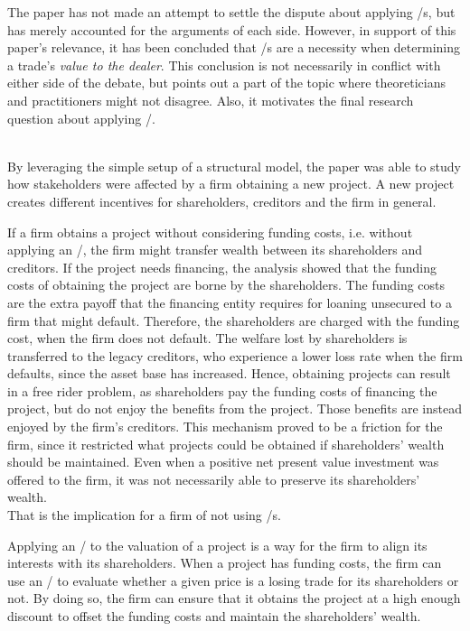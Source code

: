 \documentclass[main.tex]{subfiles}
\begin{document}
    The paper has not made an attempt to settle the dispute about applying \FVA/s,
    but has merely accounted for the arguments of each side.
    However, in support of this paper's relevance,
    it has been concluded that \FVA/s are a necessity 
    when determining a trade's \textit{value to the dealer}.
    This conclusion is not necessarily in conflict with either side of the debate,
    but points out a part of the topic where theoreticians and practitioners might not disagree.
    Also, it motivates the final research question about applying \FVA/.

    \textbf{\researchQuestionFvaImplications}\\
    By leveraging the simple setup of a structural model,
    the paper was able to study how stakeholders were affected by a firm obtaining a new project.
    A new project creates different incentives for shareholders, creditors and the firm in general.

    If a firm obtains a project without considering funding costs, 
    i.e. without applying an \FVA/,
    the firm might transfer wealth between its shareholders and creditors.
    If the project needs financing, 
    the analysis showed that the funding costs 
    of obtaining the project are borne by the shareholders.
    The funding costs are the extra payoff that the financing entity requires
    for loaning unsecured to a firm that might default.
    Therefore, the shareholders are charged with the funding cost, when the firm does not default.
    The welfare lost by shareholders is transferred to the legacy creditors,
    who experience a lower loss rate when the firm defaults, since the asset base has increased.
    Hence, obtaining projects can result in a free rider problem, 
    as shareholders pay the funding costs of financing the project,
    but do not enjoy the benefits from the project.
    Those benefits are instead enjoyed by the firm's creditors. 
    This mechanism proved to be a friction for the firm, 
    since it restricted what projects could be obtained if shareholders' wealth should be maintained.
    Even when a positive net present value investment was offered to the firm, 
    it was not necessarily able to preserve its shareholders' wealth.
    \\
    That is the implication for a firm of not using \FVA/s.

    Applying an \FVA/ to the valuation of a project is a way for the firm 
    to align its interests with its shareholders.
    When a project has funding costs,
    the firm can use an \FVA/ to evaluate
    whether a given price is a losing trade for its shareholders or not.
    By doing so, the firm can ensure that it obtains the project at a high enough discount
    to offset the funding costs and maintain the shareholders' wealth.
\end{document}
